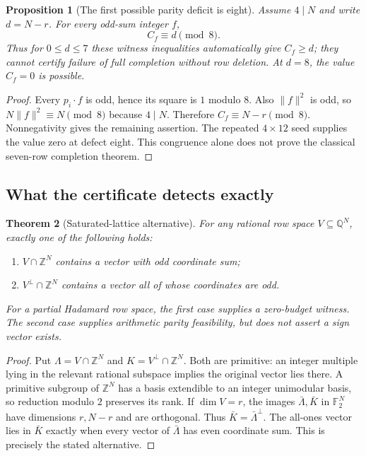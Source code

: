 \documentclass[11pt]{article}
\newtheorem{theorem}{Theorem}[section]
\newtheorem{proposition}[theorem]{Proposition}
\begin{document}
\begin{proposition}[The first possible parity deficit is eight]
Assume $4\mid N$ and write $d=N-r$. For every odd-sum integer $f$,
\[
 C_f\equiv d\pmod8.
\]
Thus for $0\le d\le7$ these witness inequalities automatically give
$C_f\ge d$; they cannot certify failure of full completion without
row deletion. At $d=8$, the value $C_f=0$ is possible.
\end{proposition}
\begin{proof}
Every $p_i\cdot f$ is odd, hence its square is $1$ modulo $8$.
Also $\|f\|^2$ is odd, so $N\|f\|^2\equiv N\pmod8$ because
$4\mid N$. Therefore $C_f\equiv N-r\pmod8$.
Nonnegativity gives the remaining assertion. The repeated $4\times12$
seed supplies the value zero at defect eight. This congruence alone
does not prove the classical seven-row completion theorem.
\end{proof}

\subsection{What the certificate detects exactly}
\begin{theorem}[Saturated-lattice alternative]
For any rational row space $V\subseteq\mathbb Q^N$, exactly one of
the following holds:
\begin{enumerate}
\item $V\cap\mathbb Z^N$ contains a vector with odd coordinate sum;
\item $V^\perp\cap\mathbb Z^N$ contains a vector all of whose
coordinates are odd.
\end{enumerate}
For a partial Hadamard row space, the first case supplies a zero-budget
witness. The second case supplies arithmetic parity feasibility,
but does not assert a sign vector exists.
\end{theorem}
\begin{proof}
Put $\Lambda=V\cap\mathbb Z^N$ and
$K=V^\perp\cap\mathbb Z^N$. Both are primitive: an integer multiple
lying in the relevant rational subspace implies the original vector
lies there. A primitive subgroup of $\mathbb Z^N$ has a basis
extendible to an integer unimodular basis, so reduction modulo $2$
preserves its rank. If $\dim V=r$, the images $\bar\Lambda,\bar K$
in $\mathbb F_2^N$ have dimensions $r,N-r$ and are orthogonal.
Thus $\bar K=\bar\Lambda^\perp$. The all-ones vector lies in
$\bar K$ exactly when every vector of $\bar\Lambda$ has even
coordinate sum. This is precisely the stated alternative.
\end{proof}
\end{document}
